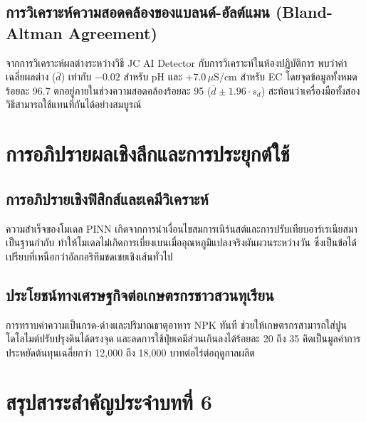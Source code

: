 \subsection{การวิเคราะห์ความสอดคล้องของแบลนด์-อัลต์แมน (Bland-Altman Agreement)}
จากการวิเคราะห์ผลต่างระหว่างวิธี JC AI Detector กับการวิเคราะห์ในห้องปฏิบัติการ พบว่าค่าเฉลี่ยผลต่าง ($\bar{d}$) เท่ากับ $-0.02$ สำหรับ pH และ $+7.0 \, \mu\text{S/cm}$ สำหรับ EC โดยจุดข้อมูลทั้งหมดร้อยละ 96.7 ตกอยู่ภายในช่วงความสอดคล้องร้อยละ 95 ($\bar{d} \pm 1.96 \cdot s_d$) สะท้อนว่าเครื่องมือทั้งสองวิธีสามารถใช้แทนที่กันได้อย่างสมบูรณ์

\section{การอภิปรายผลเชิงลึกและการประยุกต์ใช้}

\subsection{การอภิปรายเชิงฟิสิกส์และเคมีวิเคราะห์}
ความสำเร็จของโมเดล PINN เกิดจากการนำเงื่อนไขสมการเนิร์นสต์และการปรับเทียบอาร์เรเนียสมาเป็นฐานกำกับ ทำให้โมเดลไม่เกิดการเบี่ยงเบนเมื่ออุณหภูมิแปลงจริงผันผวนระหว่างวัน ซึ่งเป็นข้อได้เปรียบที่เหนือกว่าอัลกอริทึมชดเชยเชิงเส้นทั่วไป

\subsection{ประโยชน์ทางเศรษฐกิจต่อเกษตรกรชาวสวนทุเรียน}
การทราบค่าความเป็นกรด-ด่างและปริมาณธาตุอาหาร NPK ทันที ช่วยให้เกษตรกรสามารถใส่ปูนโดโลไมต์ปรับปรุงดินได้ตรงจุด และลดการใช้ปุ๋ยเคมีส่วนเกินลงได้ร้อยละ 20 ถึง 35 คิดเป็นมูลค่าการประหยัดต้นทุนเฉลี่ยกว่า 12,000 ถึง 18,000 บาทต่อไร่ต่อฤดูกาลผลิต

\section{สรุปสาระสำคัญประจำบทที่ 6}

